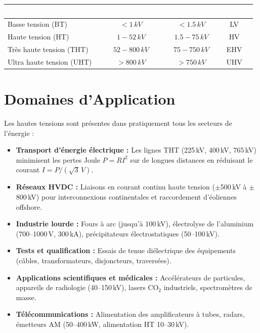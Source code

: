 \documentclass[12pt, a4paper, twoside]{report}
\begin{document}
\begin{center}
\begin{tabular}{lccc}
\toprule
\rowcolor{darkblue}
\textcolor{white}{\textbf{Catégorie}} &
\textcolor{white}{\textbf{Tension CA (rms)}} &
\textcolor{white}{\textbf{Tension CC}} &
\textcolor{white}{\textbf{Symbole}} \\
\midrule
Basse tension (BT)       & $< 1\,\si{kV}$        & $< 1.5\,\si{kV}$  & LV \\
\rowcolor{lightgray}
Haute tension (HT)       & $1 - 52\,\si{kV}$     & $1.5 - 75\,\si{kV}$ & HV \\
Très haute tension (THT) & $52 - 800\,\si{kV}$   & $75 - 750\,\si{kV}$  & EHV \\
\rowcolor{lightgray}
Ultra haute tension (UHT)& $> 800\,\si{kV}$      & $> 750\,\si{kV}$     & UHV \\
\bottomrule
\end{tabular}
\end{center}

\section{Domaines d'Application}

Les hautes tensions sont présentes dans pratiquement tous les secteurs de l'énergie :

\begin{itemize}
  \item \textbf{Transport d'énergie électrique :} Les lignes THT (225\,kV, 400\,kV, 765\,kV)
    minimisent les pertes Joule $P = RI^2$ sur de longues distances en réduisant le courant
    $I = P/({\sqrt{3}\,V})$.

  \item \textbf{Réseaux HVDC :} Liaisons en courant continu haute tension ($\pm$500\,kV à
    $\pm$800\,kV) pour interconnexions continentales et raccordement d'éoliennes offshore.

  \item \textbf{Industrie lourde :} Fours à arc (jusqu'à 100\,kV), électrolyse de l'aluminium
    (700--1000\,V, 300\,kA), précipitateurs électrostatiques (50--100\,kV).

  \item \textbf{Tests et qualification :} Essais de tenue diélectrique des équipements
    (câbles, transformateurs, disjoncteurs, traversées).

  \item \textbf{Applications scientifiques et médicales :} Accélérateurs de particules,
    appareils de radiologie (40--150\,kV), lasers CO$_2$ industriels, spectromètres de masse.

  \item \textbf{Télécommunications :} Alimentation des amplificateurs à tubes, radars,
    émetteurs AM (50--400\,kW, alimentation HT 10--30\,kV).
\end{itemize}
\end{document}
